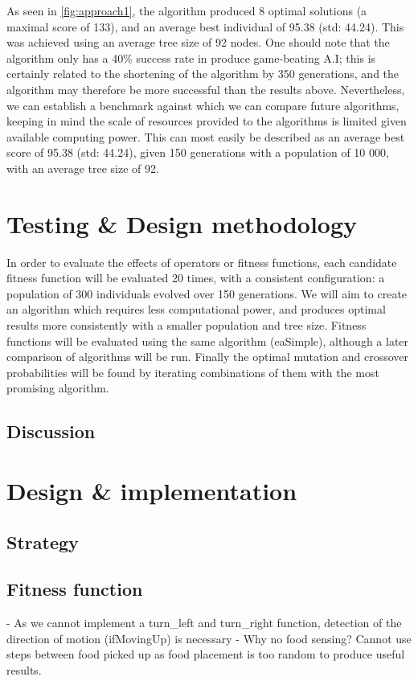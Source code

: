 \documentclass[british,10pt,a4paper]{article}
\begin{document}
As seen in \autoref{fig:approach1}, the algorithm produced 8 optimal solutions (a maximal score of 133), and an average best individual of 95.38 (std: 44.24). This was achieved using an average tree size of 92 nodes. One should note that the algorithm only has a 40\% success rate in produce game-beating A.I; this is certainly related to the shortening of the algorithm by 350 generations, and the algorithm may therefore be more successful than the results above. Nevertheless, we can establish a benchmark against which we can compare future algorithms, keeping in mind the scale of resources provided to the algorithms is limited given available computing power. This can most easily be described as an average best score of 95.38 (std: 44.24), given 150 generations with a population of 10 000, with an average tree size of 92.

\section{Testing \& Design methodology}
In order to evaluate the effects of operators or fitness functions, each candidate fitness function will be evaluated 20 times, with a consistent configuration: a population of 300 individuals evolved over 150 generations. We will aim to create an algorithm which requires less computational power, and produces optimal results more consistently with a smaller population and tree size. Fitness functions will be evaluated using the same algorithm (eaSimple), although a later comparison of algorithms will be run. Finally the optimal mutation and crossover probabilities will be found by iterating combinations of them with the most promising algorithm.

\subsection{Discussion}
\section{Design \& implementation}
\subsection{Strategy}

\subsection{Fitness function}
- As we cannot implement a turn\_left and turn\_right function, detection of the direction of motion (ifMovingUp) is necessary \newline
- Why no food sensing? \newline
Cannot use steps between food picked up as food placement is too random to produce useful results.
\end{document}
